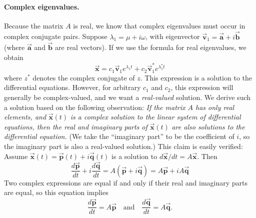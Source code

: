 \documentclass[reqno]{immbook}
\newcommand{\BA}{\vec{\textbf{a}}}
\newcommand{\BB}{\vec{\textbf{b}}}
\newcommand{\BP}{\vec{\textbf{p}}}
\newcommand{\BQ}{\vec{\textbf{q}}}
\newcommand{\BV}{\vec{\textbf{v}}}
\newcommand{\BX}{\vec{\textbf{x}}}
\begin{document}
\paragraph{Complex eigenvalues.}
Because the matrix $A$ is real, we know that complex eigenvalues must
occur in complex conjugate pairs.
Suppose $\lambda_1 = \mu + i\omega$, with eigenvector
$\BV_1=\BA+i\BB$ (where $\BA$ and $\BB$ are real vectors).
If we use the formula for real eigenvalues,
we obtain
\begin{equation}
 \BX = c_1 \BV_1 e^{\lambda_1 t} + c_2 \BV_1^* e^{\lambda_1^* t} 
\end{equation}
where $z^*$ denotes the complex conjugate of $z$.
This expression is a solution to the differential equations.
However, for arbitrary $c_1$ and $c_2$, this expression will
generally be complex-valued, and we want a \emph{real-valued}
solution.
We derive such a solution based on the following observation:
\emph{If the matrix $A$ has only real elements, and} $\BX(t)$
\emph{is a complex solution to the linear system of differential equations,
then the real and imaginary parts of} $\BX(t)$
\emph{are also solutions
to the differential equation.}  (We take the ``imaginary part''
to be the coefficient of $i$, so the imaginary part is also
a real-valued solution.)  This claim is easily verified:
Assume $\BX(t) = \BP(t) + i \BQ(t)$ is a solution to
$d\BX/dt = A\BX$.  Then
\begin{equation}
  \frac{d\BP}{dt} + i\frac{d\BQ}{dt} = A(\BP+i\BQ) = A\BP + iA\BQ
\end{equation}
Two complex expressions are equal if and only if their real
and imaginary parts are equal, so this equation implies
\begin{equation}
  \frac{d\BP}{dt} = A\BP \quad \textrm{and} \quad
  \frac{d\BQ}{dt} = A\BQ.
\end{equation}
\end{document}
